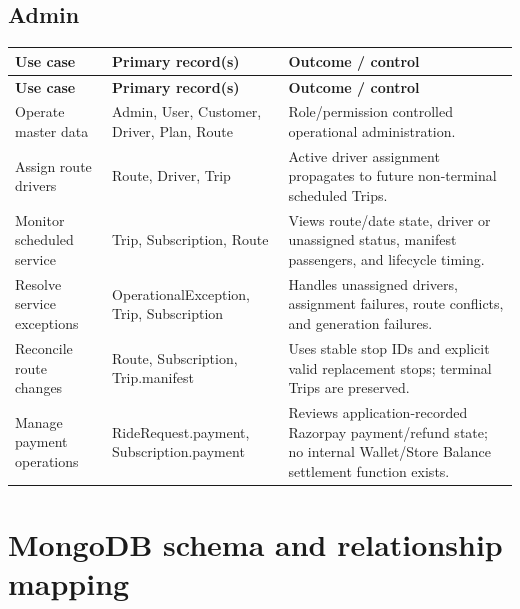 \documentclass[11pt,a4paper]{article}
\begin{document}
\subsection{Admin}
\begin{longtable}{p{} p{} Z}
\toprule
\textbf{Use case} & \textbf{Primary record(s)} & \textbf{Outcome / control} \\
\midrule
\endfirsthead
\toprule
\textbf{Use case} & \textbf{Primary record(s)} & \textbf{Outcome / control} \\
\midrule
\endhead
Operate master data & Admin, User, Customer, Driver, Plan, Route & Role/permission controlled operational administration. \\
Assign route drivers & Route, Driver, Trip & Active driver assignment propagates to future non-terminal scheduled Trips. \\
Monitor scheduled service & Trip, Subscription, Route & Views route/date state, driver or unassigned status, manifest passengers, and lifecycle timing. \\
Resolve service exceptions & OperationalException, Trip, Subscription & Handles unassigned drivers, assignment failures, route conflicts, and generation failures. \\
Reconcile route changes & Route, Subscription, Trip.manifest & Uses stable stop IDs and explicit valid replacement stops; terminal Trips are preserved. \\
Manage payment operations & RideRequest.payment, Subscription.payment & Reviews application-recorded Razorpay payment/refund state; no internal Wallet/Store Balance settlement function exists. \\
\bottomrule
\end{longtable}

\section{MongoDB schema and relationship mapping}
\end{document}
